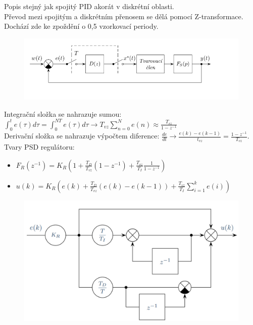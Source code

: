 Popis stejný jak spojitý PID akorát v diskrétní oblasti.\\
Převod mezi spojitým a diskrétním přenosem se dělá pomocí Z-transformace. Dochází zde ke zpoždění o 0,5 vzorkovací periody.
\begin{figure}[H]
    \includegraphics*[scale = 1]{images/PSDVzorkovani.png}
\end{figure}
Integrační složka se nahrazuje sumou: \(\int_{0}^{t}e(\tau)d\tau = \int_{0}^{NT}e(\tau)d\tau \rightarrow T_{vz}\sum_{n = 0}^{N}e(n) \approx \frac{T_{vz}}{1-z ^{-1}} \)\\
Derivační složka se nahrazuje výpočtem diference: $\frac{de}{dt} \rightarrow \frac{e(k)-e(k-1)}{t_{vz}} = \frac{1-z^{-1}}{T_{vz}}$.\\
Tvary PSD regulátoru:
\begin{itemize}
    \item $F_R(z^{-1}) = K_R(1+\frac{T_D}{T_{vz}}(1-z^{-1})+\frac{T_{vz}}{T_I}\frac{1}{1-z^{-1}})$
    \item $u(k) = K_R(e(k)+\frac{T_D}{T_{vz}}(e(k)-e(k-1))+\frac{T_{vz}}{T_I}\sum^k_{i=1}e(i))$
\end{itemize}
\begin{figure}[H]
    \centering
    \includegraphics*[scale = 0.3]{images/PSD_regulator.png}
\end{figure}
\newpage

